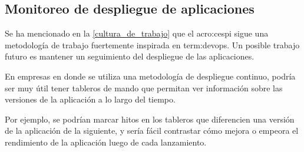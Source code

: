 \subsection{Monitoreo de despliegue de aplicaciones}
\label{del-despliegue-de-aplicaciones}

Se ha mencionado en la \autoref{cultura_de_trabajo} que el \gls{acro:cespi}
sigue una metodología de trabajo fuertemente inspirada en \gls{term:devops}.
Un posible trabajo futuro es mantener un seguimiento del despliegue de las
aplicaciones.

En empresas en donde se utiliza una metodología de despliegue continuo, podría
ser muy útil tener tableros de mando que permitan ver información sobre las
versiones de la aplicación a lo largo del tiempo.

Por ejemplo, se podrían marcar hitos en los tableros que diferencien una
versión de la aplicación de la siguiente, y sería fácil contrastar cómo mejora
o empeora el rendimiento de la aplicación luego de cada lanzamiento.
